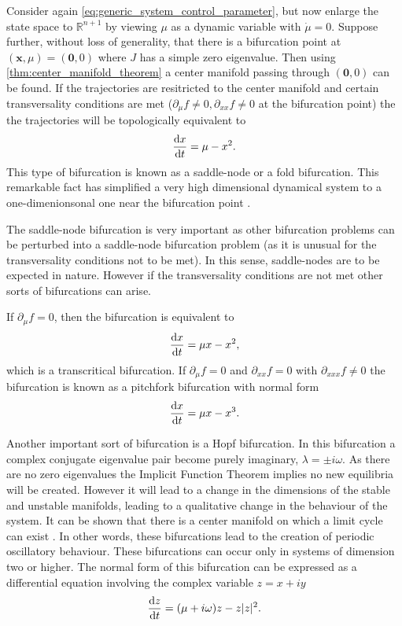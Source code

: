 Consider again \cref{eq:generic_system_control_parameter}, but now enlarge the state space to $\mathbb{R}^{n+1}$ by viewing $\mu$ as a dynamic variable with $\dot{\mu} = 0$. Suppose
further, without loss of generality, that there is a bifurcation point at $(\bm{x},\mu)  = (\bm{0},0)$ where $J$ has a simple zero eigenvalue.
Then using \cref{thm:center_manifold_theorem} a center manifold passing through
$(\bm{0},0)$ can be found. If the trajectories are resitricted to the center manifold and certain transversality conditions are met ($\partial_{\mu}f \neq 0,\partial_{xx} f\neq 0$ at the
bifurcation point) the the trajectories will be topologically equivalent \parencite{guckenheimer2013} to
\begin{equation}
  \label{eq:saddle_node}
  \dv{x}{t}  = \mu - x^2.
\end{equation}
This type of bifurcation is known as a saddle-node or a fold bifurcation.
This remarkable fact has simplified a very high dimensional dynamical system to a one-dimenionsonal one near the bifurcation point \parencite{Glendinning1994}.

The saddle-node bifurcation is very important as other bifurcation problems can be perturbed into a saddle-node bifurcation problem (as it is unusual for the transversality conditions
not to be met). In this sense, saddle-nodes are to be expected in nature. However if the transversality conditions are not met other sorts of bifurcations can arise.

If $\partial_{\mu}f=0$, then the bifurcation is equivalent to
\begin{equation}
  \label{eq:transcritical}
  \dv{x}{t} = \mu x - x^2,
\end{equation}
which is a transcritical bifurcation. If $\partial_{\mu}f = 0$ and $\partial_{xx}f=0$ with $\partial_{xxx}f \neq 0$ the bifurcation is known as a pitchfork bifurcation with normal form
\begin{equation}
  \label{eq:pitchfork}
  \dv{x}{t} = \mu x - x^3.
\end{equation}

Another important sort of bifurcation is a Hopf bifurcation. In this bifurcation a complex conjugate eigenvalue pair become purely imaginary, $\lambda = \pm i\omega$.
As there are no zero eigenvalues the Implicit Function Theorem implies no new equilibria will be created. However it will lead to a change in the dimensions of the
stable and unstable manifolds, leading to a qualitative change in the behaviour of the system. It can be shown that there is a center manifold on which a limit cycle can exist
\parencite{guckenheimer2013}. In other words, these bifurcations lead to the creation of periodic oscillatory behaviour. These bifurcations
can occur only in systems of dimension two or higher. The normal form of this bifurcation \parencite{guckenheimer2013} can be expressed as a differential equation involving the complex variable $z = x + iy$
\begin{equation}
  \label{eq:hopf}
  \dv{z}{t} = (\mu + i \omega) z - z|z|^2.
\end{equation}

